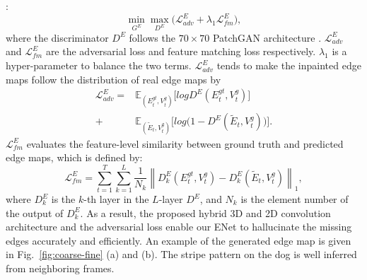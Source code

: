 :
%
\begin{equation}
	\label{eq:loss_e_}
	\min\limits_{G^E} \max \limits_{D^E} \big(\mathcal{L}^E_{adv}+\lambda_1 \mathcal{L}^E_{fm}\big),
\end{equation}
%
where the discriminator $D^E$ follows the $70\times 70$ PatchGAN architecture \cite{Isola_2017_CVPR}. 
$\mathcal{L}^E_{adv}$ and $\mathcal{L}^E_{fm}$ are the adversarial loss and feature matching loss respectively. 
$\lambda_1$ is a hyper-parameter to balance the two terms.
%
$\mathcal{L}^E_{adv}$ tends to make the inpainted edge maps follow the distribution of real edge maps by
\begin{equation} \label{eq:edge_adver}
	\begin{aligned} 
		\mathcal{L}^E_{adv}  =&\mathbb{E}_{({E}_t^{gt},{V}_t^{g})}\big[logD^E({E}_t^{gt},{V}_t^{g})\big]\\ 
		+&\mathbb{E}_{({\widetilde{E}_t},{V}_t^{g})}\big[log\big(1-D^E ( {\widetilde{E}_t},{V}_t^{g})\big)\big].
	\end{aligned}
\end{equation}
% 
$\mathcal{L}^E_{fm}$ evaluates the feature-level similarity between ground truth and predicted edge maps, which is defined by:
\begin{equation}
	\label{eq:edge_fm}
	\mathcal{L}^E_{fm}=\sum_{t=1}^T\sum_{k=1}^L{\frac{1}{N_k}\left\| D^E_k({E}_t^{gt},{V}_t^{g})- D^E_k({\widetilde{E}_t},{V}_t^{g})\right\|_1},
\end{equation}
where $D^E_k$ is the $k$-th layer in the $L$-layer $D^E$, and $N_k$ is the element number of the output of $D^E_k$.
As a result, the proposed hybrid 3D and 2D convolution architecture and the adversarial loss enable our ENet to hallucinate the missing edges accurately and efficiently.
An example of the generated edge map is given in Fig.~\ref{fig:coarse-fine} (a) and (b). 
The stripe pattern on the dog is well inferred from neighboring frames. 


